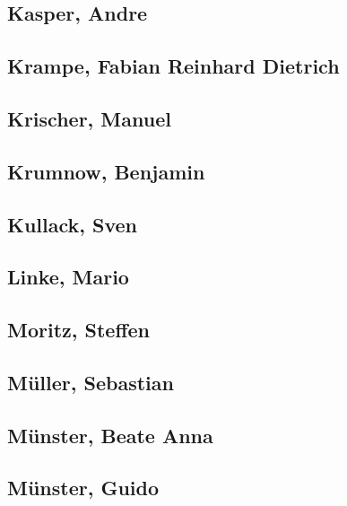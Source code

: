 \subsection{Kasper, Andre}\label{kasper-andre}

\subsection{Krampe, Fabian Reinhard
Dietrich}\label{krampe-fabian-reinhard-dietrich}

\subsection{Krischer, Manuel}\label{krischer-manuel}

\subsection{Krumnow, Benjamin}\label{krumnow-benjamin}

\subsection{\texorpdfstring{\textbf{Kullack,
Sven}}{Kullack, Sven}}\label{kullack-sven}

\subsection{Linke, Mario}\label{linke-mario}

\subsection{Moritz, Steffen}\label{moritz-steffen}

\subsection{Müller, Sebastian}\label{muxfcller-sebastian}

\subsection{Münster, Beate Anna}\label{muxfcnster-beate-anna}

\subsection{Münster, Guido}\label{muxfcnster-guido}

